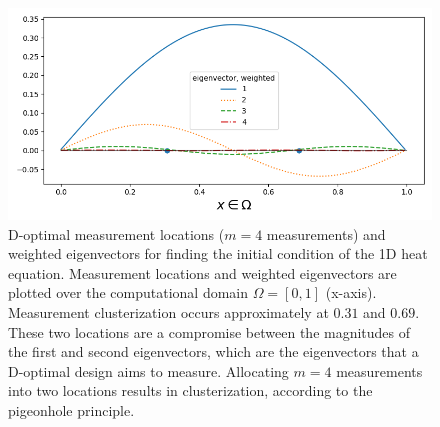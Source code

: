 \begin{figure}\label{fig:eigenvectors}
  \centering
  \includegraphics[width=\textwidth]{../latex/figs/eigenvectors_dst_scaled.png}
  \caption{D-optimal measurement locations ($m=4$ measurements) and
    weighted eigenvectors for finding the initial condition of the 1D
    heat equation. Measurement locations and weighted eigenvectors are
    plotted over the computational domain $\Omega = [0, 1]$
    (x-axis). Measurement clusterization occurs approximately at
    $0.31$ and $0.69$. These two locations are a compromise between
    the magnitudes of the first and second eigenvectors, which are the
    eigenvectors that a D-optimal design aims to measure. Allocating
    $m=4$ measurements into two locations results in clusterization,
    according to the pigeonhole principle.}
  \label{fig:why}
\end{figure}
 

